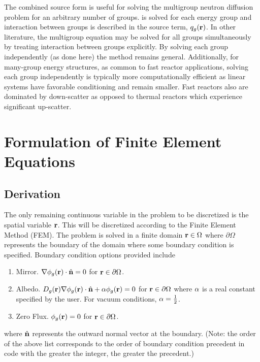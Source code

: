   The combined source form is useful for solving the
  multigroup neutron diffusion problem for an arbitrary number of groups.
  is solved for each energy group and interaction between groups is
  described in the source term, $q_g(\mathbf{r})$. In other literature, the multigroup
  equation may be solved for all groups simultaneously by treating interaction 
  between groups explicitly. By solving each group independently (as done here)
  the method remains general. Additionally, for many-group energy structures, as
  common to fast reactor applications, solving each group independently is 
  typically more computationally efficient as linear systems have favorable 
  conditioning and remain smaller. Fast reactors also are dominated by
  down-scatter as opposed to thermal reactors which experience significant
  up-scatter.

\section{Formulation of Finite Element Equations}
  \label{sec:formulation}
  \subsection{Derivation}
    \label{sec:formulation:derivation}
    The only remaining continuous variable in the problem to be discretized is 
    the spatial variable $\mathbf{r}$. This will be discretized according to the Finite 
    Element  Method (FEM). The problem is solved in a finite domain 
    $\mathbf{r} \in \Omega$ where $\partial \Omega$ represents the boundary of the 
    domain where some boundary condition is specified. Boundary condition 
    options provided include
    \begin{enumerate}
      \item Mirror. $\mathbf{\nabla} \phi_g(\mathbf{r}) \cdot \hat{\mathbf{n}} = 0$ for 
        $\mathbf{r} \in \partial \Omega$.
      \item Albedo. $D_g(\mathbf{r}) \mathbf{\nabla} \phi_g(\mathbf{r}) \cdot \hat{\mathbf{n}} + 
        \alpha \phi_g(\mathbf{r})=0$ for $\mathbf{r} \in \partial \Omega$ 
        where $\alpha$ is a real constant specified
        by the user. For vacuum conditions, $\alpha = \frac{1}{2}$.
      \item Zero Flux. $\phi_g(\mathbf{r}) = 0$ for $\mathbf{r} \in \partial \Omega$.
    \end{enumerate}
    where $\hat{\mathbf{n}}$ represents the outward normal vector at the boundary.
    (Note: the order of the above list corresponds to the order of boundary 
    condition precedent in code with the greater the integer, the greater the 
    precedent.)
    
